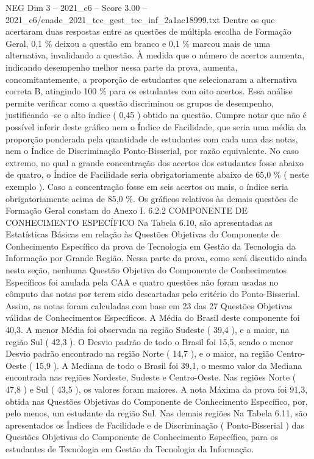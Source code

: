 \begin{textsample}{NEG Dim 3 – 2021\_c6 – Score 3.00 – 2021\_c6/enade\_2021\_tec\_gest\_tec\_inf\_2a1ac18999.txt}
Dentre os que acertaram duas respostas entre as questões de múltipla escolha de Formação Geral, 0,1 \% deixou a questão em branco e 0,1 \% marcou mais de uma alternativa, invalidando a questão.
À medida que o número de acertos aumenta, indicando desempenho melhor nessa parte da prova, aumenta, concomitantemente, a proporção de estudantes que selecionaram a alternativa correta B, atingindo 100 \% para os estudantes com oito acertos.
Essa análise permite verificar como a questão discriminou os grupos de desempenho, justificando -se o alto índice ( 0,45 ) obtido na questão.
Cumpre notar que não é possível inferir deste gráfico nem o Índice de Facilidade, que seria uma média da proporção ponderada pela quantidade de estudantes com cada uma das notas, nem o Índice de Discriminação Ponto-Bisserial, por razão equivalente.
No caso extremo, no qual a grande concentração dos acertos dos estudantes fosse abaixo de quatro, o Índice de Facilidade seria obrigatoriamente abaixo de 65,0 \% ( neste exemplo ).
Caso a concentração fosse em seis acertos ou mais, o índice seria obrigatoriamente acima de 85,0 \%.
Os gráficos relativos às demais questões de Formação Geral constam do Anexo I. 6.2.2 COMPONENTE DE CONHECIMENTO ESPECÍFICO Na Tabela 6.10, são apresentadas as Estatísticas Básicas em relação às Questões Objetivas do Componente de Conhecimento Específico da prova de Tecnologia em Gestão da Tecnologia da Informação por Grande Região.
Nessa parte da prova, como será discutido ainda nesta seção, nenhuma Questão Objetiva do Componente de Conhecimentos Específicos foi anulada pela CAA e quatro questões não foram usadas no cômputo das notas por terem sido descartadas pelo critério do Ponto-Bisserial.
Assim, as notas foram calculadas com base em 23 das 27 Questões Objetivas válidas de Conhecimentos Específicos.
A Média do Brasil deste componente foi 40,3.
A menor Média foi observada na região Sudeste ( 39,4 ), e a maior, na região Sul ( 42,3 ).
O Desvio padrão de todo o Brasil foi 15,5, sendo o menor Desvio padrão encontrado na região Norte ( 14,7 ), e o maior, na região Centro-Oeste ( 15,9 ).
A Mediana de todo o Brasil foi 39,1, o mesmo valor da Mediana encontrada nas regiões Nordeste, Sudeste e Centro-Oeste.
Nas regiões Norte ( 47,8 ) e Sul ( 43,5 ), os valores foram maiores.
A nota Máxima da prova foi 91,3, obtida nas Questões Objetivas do Componente de Conhecimento Específico, por, pelo menos, um estudante da região Sul.
Nas demais regiões Na Tabela 6.11, são apresentados os Índices de Facilidade e de Discriminação ( Ponto-Bisserial ) das Questões Objetivas do Componente de Conhecimento Específico, para os estudantes de Tecnologia em Gestão da Tecnologia da Informação.

\end{textsample}
